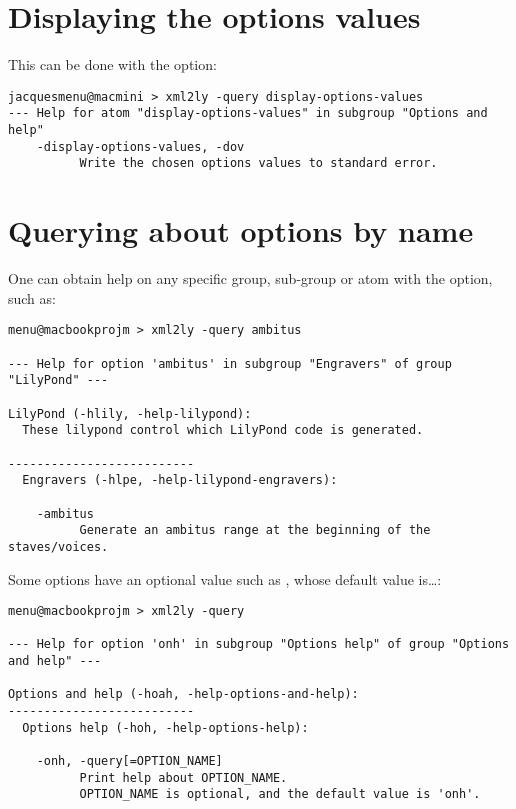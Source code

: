 \section{Displaying the options values}

This can be done with the  option:
\begin{lstlisting}[language=Terminal]
jacquesmenu@macmini > xml2ly -query display-options-values
--- Help for atom "display-options-values" in subgroup "Options and help"
    -display-options-values, -dov
          Write the chosen options values to standard error.
\end{lstlisting}


\section{Querying about options by name}

One can obtain help on any specific group, sub-group or atom with the  option, such as:
\begin{lstlisting}[language=Terminal]
menu@macbookprojm > xml2ly -query ambitus

--- Help for option 'ambitus' in subgroup "Engravers" of group "LilyPond" ---

LilyPond (-hlily, -help-lilypond):
  These lilypond control which LilyPond code is generated.

--------------------------
  Engravers (-hlpe, -help-lilypond-engravers):

    -ambitus
          Generate an ambitus range at the beginning of the staves/voices.

\end{lstlisting}

Some options have an optional value such as , whose default value is\dots {}:
\begin{lstlisting}[language=Terminal]
menu@macbookprojm > xml2ly -query

--- Help for option 'onh' in subgroup "Options help" of group "Options and help" ---

Options and help (-hoah, -help-options-and-help):
--------------------------
  Options help (-hoh, -help-options-help):

    -onh, -query[=OPTION_NAME]
          Print help about OPTION_NAME.
          OPTION_NAME is optional, and the default value is 'onh'.
\end{lstlisting}


